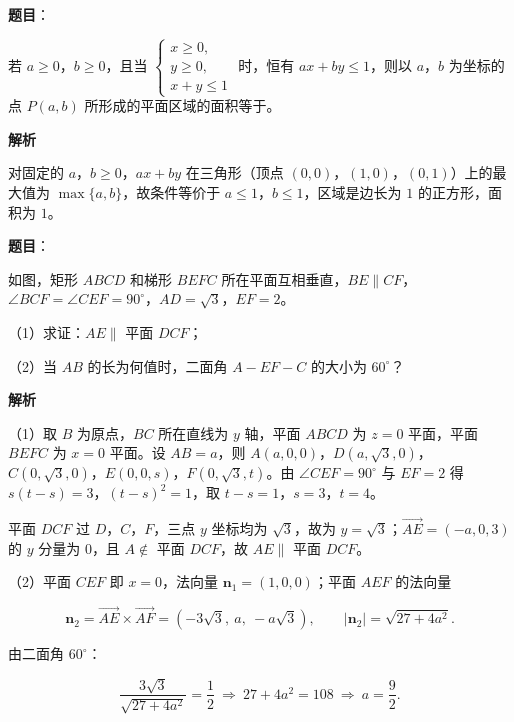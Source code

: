 \begin{answer}

\textbf{题目}：

若 $a\geqslant0$，$b\geqslant0$，且当 $\begin{cases}x\geqslant0,\\ y\geqslant0,\\ x+y\leqslant1\end{cases}$ 时，恒有 $ax+by\leqslant1$，则以 $a$，$b$ 为坐标的点 $P(a,b)$ 所形成的平面区域的面积等于\gkblank{}。

\textbf{解析}

对固定的 $a$，$b\geqslant0$，$ax+by$ 在三角形（顶点 $(0,0)$，$(1,0)$，$(0,1)$）上的最大值为 $\max\{a,b\}$，故条件等价于 $a\leqslant1$，$b\leqslant1$，区域是边长为 $1$ 的正方形，面积为 $1$。


\end{answer}
\begin{answer}

\textbf{题目}：

如图，矩形 $ABCD$ 和梯形 $BEFC$ 所在平面互相垂直，$BE\parallel CF$，$\angle BCF=\angle CEF=90^\circ$，$AD=\sqrt3$，$EF=2$。

（1）求证：$AE\parallel$ 平面 $DCF$；

（2）当 $AB$ 的长为何值时，二面角 $A-EF-C$ 的大小为 $60^\circ$？
\nopagebreak[4]
\begin{center}\end{center}
\nopagebreak[4]
\textbf{解析}

（1）取 $B$ 为原点，$BC$ 所在直线为 $y$ 轴，平面 $ABCD$ 为 $z=0$ 平面，平面 $BEFC$ 为 $x=0$ 平面。设 $AB=a$，则 $A(a,0,0)$，$D(a,\sqrt3,0)$，$C(0,\sqrt3,0)$，$E(0,0,s)$，$F(0,\sqrt3,t)$。由 $\angle CEF=90^\circ$ 与 $EF=2$ 得 $s(t-s)=3$，$(t-s)^2=1$，取 $t-s=1$，$s=3$，$t=4$。

平面 $DCF$ 过 $D$，$C$，$F$，三点 $y$ 坐标均为 $\sqrt3$，故为 $y=\sqrt3$；$\overrightarrow{AE}=(-a,0,3)$ 的 $y$ 分量为 $0$，且 $A\notin$ 平面 $DCF$，故 $AE\parallel$ 平面 $DCF$。

（2）平面 $CEF$ 即 $x=0$，法向量 $\boldsymbol n_1=(1,0,0)$；平面 $AEF$ 的法向量

\nopagebreak[4]
\[\boldsymbol n_2=\overrightarrow{AE}\times\overrightarrow{AF}=\left(-3\sqrt3,\ a,\ -a\sqrt3\right),\qquad |\boldsymbol n_2|=\sqrt{27+4a^2}.\]

由二面角 $60^\circ$：

\nopagebreak[4]
\[\frac{3\sqrt3}{\sqrt{27+4a^2}}=\frac12\ \Longrightarrow\ 27+4a^2=108\ \Longrightarrow\ a=\frac92.\]


\end{answer}
